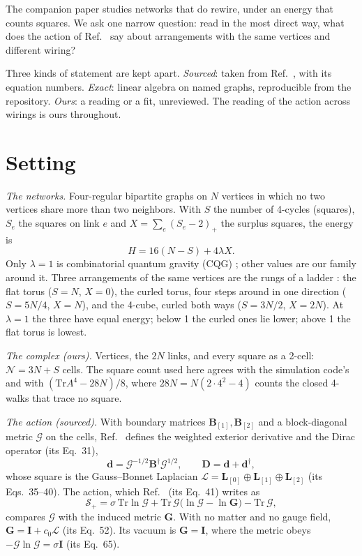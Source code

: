 \documentclass[pre,twocolumn,superscriptaddress,nofootinbib]{revtex4-2}
\begin{document}
The companion paper \cite{paper1} studies networks that do rewire, under an energy that counts squares. We ask one
narrow question: read in the most direct way, what does the action of Ref.~\cite{Bia24} say about arrangements with
the same vertices and different wiring?

Three kinds of statement are kept apart. \emph{Sourced}: taken from Ref.~\cite{Bia24}, with its equation numbers.
\emph{Exact}: linear algebra on named graphs, reproducible from the repository. \emph{Ours}: a reading or a fit,
unreviewed. The reading of the action across wirings is ours throughout.

\section{Setting}

\emph{The networks.} Four-regular bipartite graphs on $N$ vertices in which no two vertices share more than two
neighbors. With $S$ the number of 4-cycles (squares), $S_e$ the squares on link $e$ and $X=\sum_e(S_e-2)_+$ the
surplus squares, the energy is
\begin{equation}
H = 16(N-S) + 4\lambda X .
\label{eq:H}
\end{equation}
Only $\lambda=1$ is combinatorial quantum gravity (CQG) \cite{KTB19,T25}; other values are our family around it.
Three arrangements of the same vertices are the rungs of a ladder \cite{paper1}: the flat torus ($S=N$, $X=0$), the
curled torus, four steps around in one direction ($S=5N/4$, $X=N$), and the 4-cube, curled both ways ($S=3N/2$,
$X=2N$). At $\lambda=1$ the three have equal energy; below 1 the curled ones lie lower; above 1 the flat torus is
lowest.

\emph{The complex (ours).} Vertices, the $2N$ links, and every square as a 2-cell: $\mathcal{N}=3N+S$ cells. The
square count used here agrees with the simulation code's and with $(\mathrm{Tr}A^4-28N)/8$, where
$28N=N(2\cdot4^2-4)$ counts the closed 4-walks that trace no square.

\emph{The action (sourced).} With boundary matrices $\mathbf{B}_{[1]},\mathbf{B}_{[2]}$ and a block-diagonal metric
$\boldsymbol{\mathcal{G}}$ on the cells, Ref.~\cite{Bia24} defines the weighted exterior derivative and the Dirac
operator (its Eq.~31),
\[
\mathbf{d}=\boldsymbol{\mathcal{G}}^{-1/2}\mathbf{B}^{\dagger}\boldsymbol{\mathcal{G}}^{1/2},
\qquad
\mathbf{D}=\mathbf{d}+\mathbf{d}^{\dagger},
\]
whose square is the Gauss--Bonnet Laplacian
$\boldsymbol{\mathcal{L}}=\mathbf{L}_{[0]}\oplus\mathbf{L}_{[1]}\oplus\mathbf{L}_{[2]}$ (its Eqs.~35--40). The
action, which Ref.~\cite{Bia24} (its Eq.~41) writes as
\[
\mathcal{S}_{+}=\sigma\,\mathrm{Tr}\ln\boldsymbol{\mathcal{G}}
+\mathrm{Tr}\,\boldsymbol{\mathcal{G}}\bigl(\ln\boldsymbol{\mathcal{G}}-\ln\mathbf{G}\bigr)
-\mathrm{Tr}\,\boldsymbol{\mathcal{G}},
\]
compares $\boldsymbol{\mathcal{G}}$ with the induced metric $\mathbf{G}$. With no matter and no gauge field,
$\mathbf{G}=\mathbf{I}+c_0\boldsymbol{\mathcal{L}}$ (its Eq.~52). Its vacuum is $\mathbf{G}=\mathbf{I}$, where the metric obeys
$-\boldsymbol{\mathcal{G}}\ln\boldsymbol{\mathcal{G}}=\sigma\mathbf{I}$ (its Eq.~65).
\end{document}

